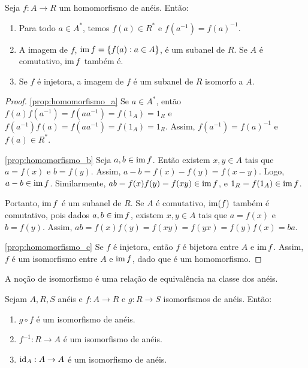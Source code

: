 \begin{prop}
    Seja $f:A\rightarrow R$ um homomorfismo de anéis. Então:
    \begin{enumerate}[label=\alph*)]
        \item Para todo $a \in A^*$, temos $f(a)\in  R^*$ e $f(a^{-1})=f(a)^{-1}$. \label{prop:homomorfismo_a}
        \item A imagem de $f$, $\operatorname{im} f=\{f(a): a \in A\}$, é um subanel de $R$. Se $A$ é comutativo, $\operatorname{im} f$ também é.  \label{prop:homomorfismo_b}
        \item Se $f$ é injetora, a imagem de $f$ é um subanel de $R$ isomorfo a $A$. \label{prop:homomorfismo_c}
    \end{enumerate}
\end{prop}
\begin{proof}
\ref{prop:homomorfismo_a} Se $a \in A^*$, então $f(a)f(a^{-1})=f(aa^{-1})=f(1_A)=1_R$ e $f(a^{-1})f(a)=f(aa^{-1})=f(1_A)=1_R$. Assim, $f(a^{-1})=f(a)^{-1}$ e $f(a)\in R^*$.

\ref{prop:homomorfismo_b} Seja $a, b \in \operatorname{im} f$. Então existem $x, y \in A$ tais que $a=f(x)$ e $b=f(y)$.
Assim, $a-b=f(x)-f(y)=f(x-y)$. Logo, $a-b \in \operatorname{im} f$.
Similarmente, $ab=f(x)f(y)=f(xy)\in \operatorname{im} f$, e $1_R=f(1_A)\in \operatorname{im} f$.

Portanto, $\operatorname{im} f$ é um subanel de $R$.
Se $A$ é comutativo, $\operatorname{im}(f)$ também é comutativo, pois dados $a, b \in \operatorname{im} f$, existem $x, y \in A$ tais que $a=f(x)$ e $b=f(y)$.
Assim, $ab=f(x)f(y)=f(xy)=f(yx)=f(y)f(x)=ba$.

\ref{prop:homomorfismo_c} Se $f$ é injetora, então $f$ é bijetora entre $A$ e $\operatorname{im} f$. Assim, $f$ é um isomorfismo entre $A$ e $\operatorname{im} f$, dado que é um homomorfismo.
\end{proof}

A noção de isomorfismo é uma relação de equivalência na classe dos anéis.

\begin{prop}
    Sejam $A, R, S$ anéis e $f:A\rightarrow R$ e $g:R\rightarrow S$ isomorfismos de anéis.
    Então:
    \begin{enumerate}[label=\alph*)]
        \item $g\circ f$ é um isomorfismo de anéis. \label{prop:isomorfismo_a}
        \item $f^{-1}:R\rightarrow A$ é um isomorfismo de anéis. \label{prop:isomorfismo_b}
        \item $\operatorname{id}_A:A\rightarrow A$ é um isomorfismo de anéis. \label{prop:isomorfismo_c}
    \end{enumerate}
\end{prop}

